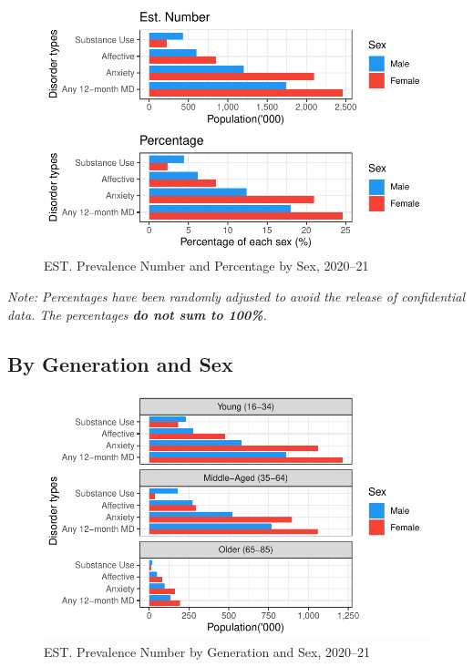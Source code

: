 \documentclass[
  a4paper,
  DIV=11,
  numbers=noendperiod]{scrreport}
\begin{document}
\begin{figure}

\caption{\label{fig-12as}EST. Prevalence Number and Percentage by Sex,
2020--21}

{\centering \includegraphics{./chap1-prevalence-of-md_files/figure-pdf/fig-12as-1.pdf}

}

\end{figure}

\emph{Note: Percentages have been randomly adjusted to avoid the release
of confidential data. The percentages \textbf{do not sum to 100\%}.}

\hypertarget{by-generation-and-sex}{%
\subsection{By Generation and Sex}\label{by-generation-and-sex}}

\begin{figure}

\caption{\label{fig-12gsn}EST. Prevalence Number by Generation and Sex,
2020--21}

{\centering \includegraphics{./chap1-prevalence-of-md_files/figure-pdf/fig-12gsn-1.pdf}

}

\end{figure}
\end{document}
